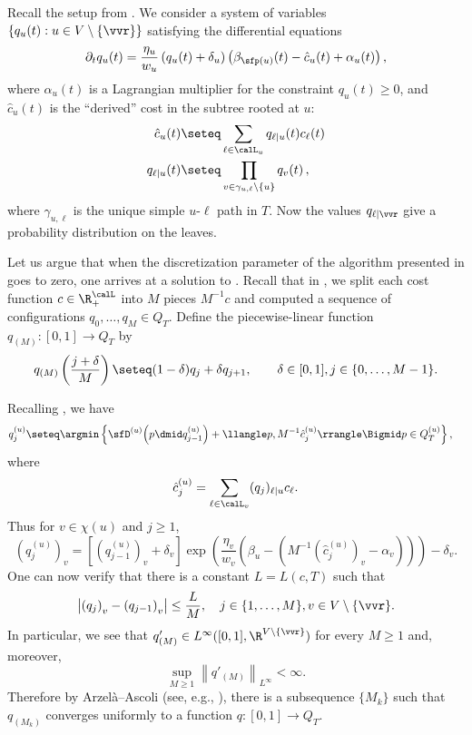 Recall the setup from .
We consider a system of variables $\{q_u(t) : u \in V \setminus \{\vvr\}\}$
satisfying the differential equations
\begin{equation}\label{eq:star-dynamics2}
\partial_t q_u(t) = \frac{\eta_u}{w_u} \left(q_u(t)+\delta_u\right) \left(\beta_{\sfp(u)}(t) - \hat{c}_u(t) + \alpha_u(t)\right),
\end{equation}
where $\alpha_u(t)$ is a Lagrangian multiplier for the constraint $q_u(t)\ge 0$, and $\hat{c}_u(t)$ is the ``derived'' cost
in the subtree rooted at $u$:
\begin{align*}
\hat{c}_u(t) &\seteq \sum_{\ell \in \calL_u} q_{\ell\mid u}(t) c_{\ell}(t)\\
q_{\ell \mid u}(t) &\seteq \prod_{v \in \gamma_{u,\ell} \setminus \{u\}} q_v(t)\,,\nonumber
\end{align*}
where $\gamma_{u,\ell}$ is the unique simple $u$-$\ell$ path in $T$.
Now the values $q_{\ell \mid \vvr}$ give a probability distribution on the leaves.

Let us argue that when 
the discretization parameter of the
algorithm presented in  goes to zero,
one arrives at a solution to .
Recall that in , we split each cost function $c\in\R_+^{\calL}$
into $M$ pieces $M^{-1} c$ and computed a sequence of
configurations $q_0,\dots,q_M \in Q_T$.
Define the piecewise-linear function $q_{(M)} : [0,1] \to Q_T$ by
\[
q_{(M)}\left(\frac{j+\delta}{M}\right) \seteq (1-\delta) q_{j} + \delta q_{j+1}, \qquad \delta \in [0,1], j \in \{0,\ldots,M-1\}.
\]

Recalling , we have
\begin{align}\label{eq:qeps}
q_j^{(u)} &\seteq \argmin\left\{ \sfD^{(u)}\!\left(p \dmid q_{j-1}^{(u)}\right) +  \llangle p, M^{-1} \hat{c}_j^{(u)} \rrangle \Bigmid p \in
Q^{(u)}_T\right\},
\end{align}
where
\[
\hat{c}_j^{(u)} = \sum_{\ell \in \calL_v} (q_j)_{\ell \mid u} c_{\ell}.
\]
Thus for $v \in \chi(u)$ and $j \geq 1$,
\[
\left(q_j^{(u)}\right)_v = \left[\left(q_{j-1}^{(u)}\right)_v + \delta_v\right] \exp\left(\frac{\eta_v}{w_v} \left(\beta_u - (M^{-1}(\hat{c}^{(u)}_j)_v - \alpha_v)\right)\right) - \delta_v.
\]
One can now verify that there is a constant $L=L(c,T)$ such that
\[
\left|\left(q_j\right)_v - \left(q_{j-1}\right)_v\right| \leq \frac{L}{M}, \quad j \in \{1,\ldots,M\}, v \in V \setminus \{\vvr\}.
\]
In particular, we see that $q'_{(M)} \in L^{\infty}([0,1],\R^{V \setminus \{\vvr\}})$ for every $M \geq 1$ and, moreover,
\begin{equation}\label{eq:derivbnd}
\sup_{M \geq 1} \left\|q'_{(M)}\right\|_{L^{\infty}} < \infty.
\end{equation}
Therefore by Arzel\`a--Ascoli (see, e.g., \cite[Thm. 0.3.1]{AC84}), there is a subsequence $\{M_k\}$ such that $q_{(M_k)}$ converges uniformly %
to a function $q : [0,1] \to Q_T$.

